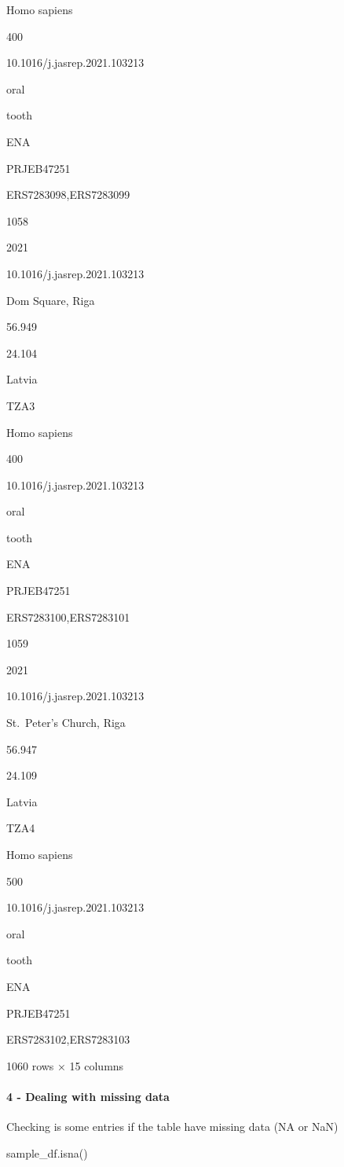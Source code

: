 \documentclass[
  letterpaper,
]{book}
\let\oldparagraph\paragraph
\renewcommand{\paragraph}[1]{\oldparagraph{#1}\mbox{}}
\newenvironment{Shaded}{}{}
\newcommand{\NormalTok}[1]{\textcolor[rgb]{0.14,0.16,0.18}{#1}}
\begin{document}
Homo sapiens

400

10.1016/j.jasrep.2021.103213

oral

tooth

ENA

PRJEB47251

ERS7283098,ERS7283099

1058

2021

10.1016/j.jasrep.2021.103213

Dom Square, Riga

56.949

24.104

Latvia

TZA3

Homo sapiens

400

10.1016/j.jasrep.2021.103213

oral

tooth

ENA

PRJEB47251

ERS7283100,ERS7283101

1059

2021

10.1016/j.jasrep.2021.103213

St.~Peter's Church, Riga

56.947

24.109

Latvia

TZA4

Homo sapiens

500

10.1016/j.jasrep.2021.103213

oral

tooth

ENA

PRJEB47251

ERS7283102,ERS7283103

1060 rows × 15 columns

\hypertarget{dealing-with-missing-data}{%
\paragraph{4 - Dealing with missing
data}\label{dealing-with-missing-data}}

Checking is some entries if the table have missing data (NA or NaN)

\begin{Shaded}
\begin{Highlighting}[]
\NormalTok{sample\_df.isna()}
\end{Highlighting}
\end{Shaded}
\end{document}
